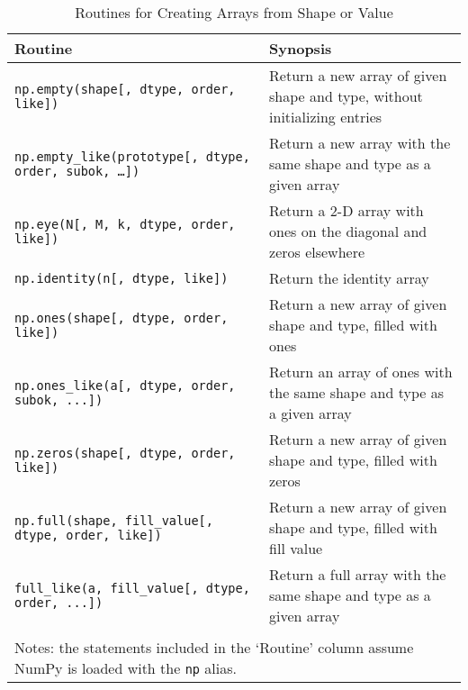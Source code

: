 \documentclass[a4paper,11pt]{book}
\numberwithin{figure}{chapter}
\numberwithin{table}{chapter}
\begin{document}
\begin{sidewaystable}[!htbp]
	\centering
	\caption{Routines for Creating Arrays from Shape or Value}
	\label{tab:array_from_shape_or_value}
	\begin{tabular}{lp{12cm}}
		\toprule \toprule
			Routine & Synopsis \\
			\midrule
			\texttt{np.empty(shape[, dtype, order, like])} & Return a new array of given shape and type, without initializing entries \\
			\texttt{np.empty\_like(prototype[, dtype, order, subok, \ldots])} & Return a new array with the same shape and type as a given array \\
			\texttt{np.eye(N[, M, k, dtype, order, like])} & Return a 2-D array with ones on the diagonal and zeros elsewhere\\
			\texttt{np.identity(n[, dtype, like])} & Return the identity array \\
			\texttt{np.ones(shape[, dtype, order, like])} & Return a new array of given shape and type, filled with ones \\
			\texttt{np.ones\_like(a[, dtype, order, subok, ...])} & Return an array of ones with the same shape and type as a given array \\
			\texttt{np.zeros(shape[, dtype, order, like])} & Return a new array of given shape and type, filled with zeros \\
			\texttt{np.full(shape, fill\_value[, dtype, order, like])} & Return a new array of given shape and type, filled with fill value \\
			\texttt{full\_like(a, fill\_value[, dtype, order, ...])} & Return a full array with the same shape and type as a given array \\
	     	\bottomrule \\[-1.8ex]
	        \multicolumn{2}{l}{Notes: the statements included in the `Routine' column assume NumPy is loaded with the \texttt{np} alias.} \\
	\end{tabular}
\end{sidewaystable}
\end{document}
